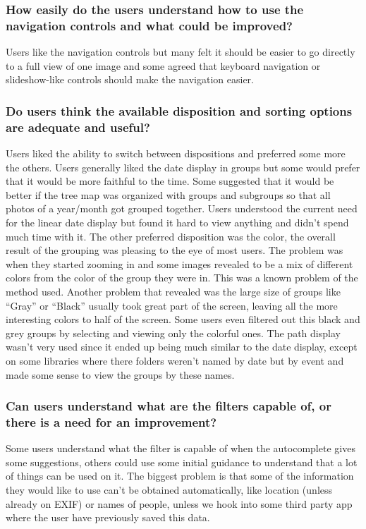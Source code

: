 \subsubsection{How easily do the users understand how to use the navigation controls and what could be improved?}
Users like the navigation controls but many felt it should be easier to go directly to a full view of one image and some agreed that keyboard navigation or slideshow-like controls should make the navigation easier.

\subsubsection{Do users think the available disposition and sorting options are adequate and useful?}
Users liked the ability to switch between dispositions and preferred some more the others.
Users generally liked the date display in groups but some would prefer that it would be more faithful to the time. Some suggested that it would be better if the tree map was organized with groups and subgroups so that all photos of a year/month got grouped together. Users understood the current need for the linear date display but found it hard to view anything and didn't spend much time with it.
The other preferred disposition was the color, the overall result of the grouping was pleasing to the eye of most users. The problem was when they started zooming in and some images revealed to be a mix of different colors from the color of the group they were in. This was a known problem of the method used. Another problem that revealed was the large size of groups like ``Gray'' or ``Black'' usually took great part of the screen, leaving all the more interesting colors to half of the screen. Some users even filtered out this black and grey groups by selecting and viewing only the colorful ones.
The path display wasn't very used since it ended up being much similar to the date display, except on some libraries where there folders weren't named by date but by event and made some sense to view the groups by these names. 

\subsubsection{Can users understand what are the filters capable of, or there is a need for an improvement?}
Some users understand what the filter is capable of when the autocomplete gives some suggestions, others could use some initial guidance to understand that a lot of things can be used on it. The biggest problem is that some of the information they would like to use can't be obtained automatically, like location (unless already on EXIF) or names of people, unless we hook into some third party app where the user have previously saved this data.

